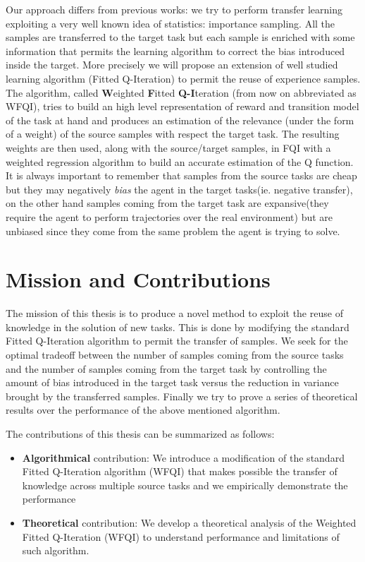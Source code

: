   \noindent Our approach differs from previous works: we try to perform transfer learning exploiting a very well known
  idea of statistics: importance sampling. All the samples are transferred to the target task but each sample is
  enriched with some information that permits the learning algorithm to correct the bias introduced inside the target.\newline
  More precisely we will propose an extension of well studied learning algorithm (Fitted Q-Iteration) to permit
  the reuse of experience samples. The algorithm, called \textbf{W}eighted \textbf{F}itted \textbf{Q-I}teration (from now on abbreviated as WFQI),
  tries to build an high level representation of reward and transition model of the task at hand and produces an
  estimation of the relevance (under the form of a weight) of the source samples with respect the target task. The
  resulting weights are then used, along with the source/target samples, in FQI with a weighted regression algorithm
  to build an accurate estimation of the Q function.\newline
  It is always important to remember that samples from the source tasks are cheap but they may negatively \textit{bias} the agent
  in the target tasks(ie. negative transfer), on the other hand samples coming from
  the target task are expansive(they require the agent to perform trajectories over the real environment)
  but are unbiased since they come from the same problem the agent is trying to solve.

  \section{Mission and Contributions}
    \noindent The mission of this thesis is to produce a novel method to exploit the reuse
    of knowledge in the solution of new tasks. This is done by modifying the standard
    Fitted Q-Iteration algorithm to permit the transfer of samples.
    We seek for the optimal tradeoff between the number of samples coming from the
    source tasks and the number of samples coming from the target task by
    controlling the amount of bias introduced in the target task versus
    the reduction in variance brought by the transferred samples.\newline
    Finally we try to prove a series of theoretical results over the performance
    of the above mentioned algorithm.\newline

    The contributions of this thesis can be summarized as follows:
    \begin{itemize}
      \item \textbf{Algorithmical} contribution: We introduce a modification
            of the standard Fitted Q-Iteration algorithm (WFQI) that
            makes possible the transfer of knowledge across multiple
            source tasks and we empirically demonstrate the performance

      \item \textbf{Theoretical} contribution: We develop a theoretical analysis of
            the Weighted Fitted Q-Iteration (WFQI) to understand performance and limitations
            of such algorithm.
    \end{itemize}

